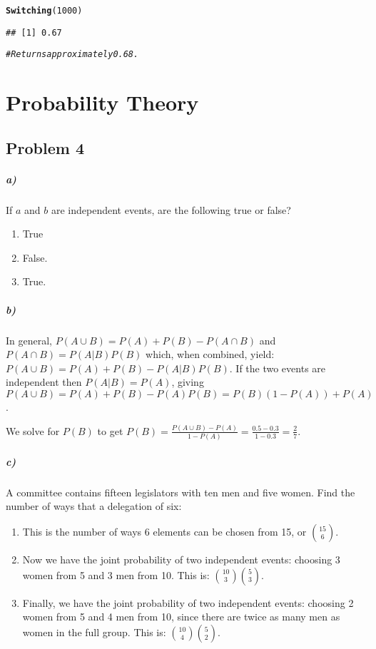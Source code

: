 \documentclass[12pt,letter]{article}\usepackage[]{graphicx}\usepackage[]{color}
\makeatletter
\newcommand{\hlnum}[1]{\textcolor[rgb]{0.686,0.059,0.569}{#1}}%
\newcommand{\hlcom}[1]{\textcolor[rgb]{0.678,0.584,0.686}{\textit{#1}}}%
\newcommand{\hlstd}[1]{\textcolor[rgb]{0.345,0.345,0.345}{#1}}%
\newcommand{\hlkwd}[1]{\textcolor[rgb]{0.737,0.353,0.396}{\textbf{#1}}}%
\newenvironment{kframe}{%
 \def\at@end@of@kframe{}%
 \ifinner\ifhmode%
  \def\at@end@of@kframe{\end{minipage}}%
  \begin{minipage}{\columnwidth}%
 \fi\fi%
 \def\FrameCommand##1{\hskip\@totalleftmargin \hskip-\fboxsep
 \colorbox{shadecolor}{##1}\hskip-\fboxsep
     \hskip-\linewidth \hskip-\@totalleftmargin \hskip\columnwidth}%
 \MakeFramed {\advance\hsize-\width
   \@totalleftmargin\z@ \linewidth\hsize
   \@setminipage}}%
 {\par\unskip\endMakeFramed%
 \at@end@of@kframe}
\newenvironment{knitrout}{}{} %
\makeatother
\begin{document}
\begin{knitrout}
\begin{kframe}
\begin{alltt}
\hlkwd{Switching}\hlstd{(}\hlnum{1000}\hlstd{)}
\end{alltt}
\begin{verbatim}
## [1] 0.67
\end{verbatim}
\begin{alltt}
\hlcom{# Returns approximately 0.68.}
\end{alltt}
\end{kframe}
\end{knitrout}



\section*{Probability Theory}

\subsection*{Problem 4}

\subparagraph{a)} If $a$ and $b$ are independent events, are the following true or false?
\begin{enumerate}
	\item True %
	\item False. %
	\item True. %
\end{enumerate}

\subparagraph{b)} In general, $P(A \cup B)=P(A)+P(B) - P(A \cap B)$ and $P(A \cap B)=P(A|B)P(B)$ which, when combined, yield: $P(A \cup B)=P(A)+P(B) - P(A|B)P(B)$. If the two events are independent then $P(A|B)=P(A)$, giving $P(A \cup B)=P(A)+P(B) - P(A)P(B) = P(B)(1-P(A))+P(A)$.

We solve for $P(B)$ to get $P(B)=\frac{P(A \cup B)-P(A)}{1-P(A)}=\frac{0.5-0.3}{1-0.3}=\frac{2}{7}$.

\subparagraph{c)} A committee contains fifteen legislators with ten men and five women. Find the number of ways that a delegation of six:
\begin{enumerate}
	\item This is the number of ways 6 elements can be chosen from 15, or ${15}\choose{6}$. %
	\item Now we have the joint probability of two independent events: choosing 3 women from 5 and 3 men from 10. This is: ${{10}\choose{3}} {{5}\choose{3}}$. %
	\item Finally, we have the joint probability of two independent events: choosing 2 women from 5 and 4 men from 10, since there are twice as many men as women in the full group. This is: ${{10}\choose{4}} {{5}\choose{2}}$. %
\end{enumerate}
\end{document}
